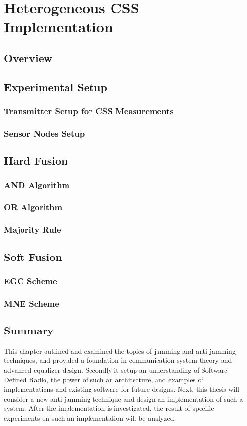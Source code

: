 \chapter{Heterogeneous CSS Implementation}
\label{chapter4}
\section{Overview}
\section{Experimental Setup}
\subsection{Transmitter Setup for CSS Measurements}
\subsection{Sensor Nodes Setup}
\section{Hard Fusion}
	\subsection{AND Algorithm}
	\subsection{OR Algorithm}
	\subsection{Majority Rule}
\section{Soft Fusion}
	\subsection{EGC Scheme}
	\subsection{MNE Scheme}
\section{Summary}

This chapter outlined and examined the topics of jamming and anti-jamming techniques, and provided a foundation in communication system theory and advanced equalizer design.  Secondly it setup an understanding of Software-Defined Radio, the power of such an architecture, and examples of implementations and existing software for future designs.  Next, this thesis will consider a new anti-jamming technique and design an implementation of such a system.  After the implementation is investigated, the result of specific experiments on such an implementation will be analyzed.\\
